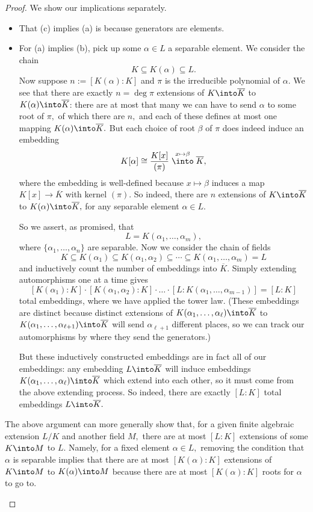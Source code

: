 \begin{proof}
	We show our implications separately.
	\begin{itemize}
		\item That (c) implies (a) is because generators are elements.

		\item For (a) implies (b), pick up some $\alpha\in L$ a separable element. We consider the chain
		\[K\subseteq K(\alpha)\subseteq L.\]
		Now suppose $n:=[K(\alpha):K]$ and $\pi$ is the irreducible polynomial of $\alpha.$ We see that there are exactly $n=\deg\pi$ extensions of $K\into\overline K$ to $K(\alpha)\into\overline K$: there are at most that many we can have to send $\alpha$ to some root of $\pi,$ of which there are $n,$ and each of these defines at most one mapping $K(\alpha)\into\overline K.$ But each choice of root $\beta$ of $\pi$ does indeed induce an embedding
		\[K[\alpha]\cong\frac{K[x]}{(\pi)}\stackrel{x\mapsto\beta}\into\overline K,\]
		where the embedding is well-defined because $x\mapsto\beta$ induces a map $K[x]\to\overline K$ with kernel $(\pi).$ So indeed, there are $n$ extensions of $K\into\overline K$ to $K(\alpha)\into\overline K,$ for any separable element $\alpha\in L.$

		So we assert, as promised, that
		\[L=K(\alpha_1,\ldots,\alpha_m),\]
		where $\{\alpha_1,\ldots,\alpha_n\}$ are separable. Now we consider the chain of fields
		\[K\subseteq K(\alpha_1)\subseteq K(\alpha_1,\alpha_2)\subseteq\cdots\subseteq K(\alpha_1,\ldots,\alpha_m)=L\]
		and inductively count the number of embeddings into $\overline K.$ Simply extending automorphisms one at a time gives
		\[[K(\alpha_1):K]\cdot[K(\alpha_1,\alpha_2):K]\cdot\ldots\cdot[L:K(\alpha_1,\ldots,\alpha_{m-1})]=[L:K]\]
		total embeddings, where we have applied the tower law. (These embeddings are distinct because distinct extensions of $K(\alpha_1,\ldots,\alpha_\ell)\into\overline K$ to $K(\alpha_1,\ldots,\alpha_{\ell+1})\into\overline K$ will send $\alpha_{\ell+1}$ different places, so we can track our automorphisms by where they send the generators.)

		But these inductively constructed embeddings are in fact all of our embeddings: any embedding $L\into\overline K$ will induce embeddings $K(\alpha_1,\ldots,\alpha_\ell)\into\overline K$ which extend into each other, so it must come from the above extending process. So indeed, there are exactly $[L:K]$ total embeddings $L\into\overline K.$
	\end{itemize}
	\begin{remark} \label{rem:boundextensions}
		The above argument can more generally show that, for a given finite algebraic extension $L/K$ and another field $M,$ there are at most $[L:K]$ extensions of some $K\into M$ to $L.$ Namely, for a fixed element $\alpha\in L,$ removing the condition that $\alpha$ is separable implies that there are at most $[K(\alpha):K]$ extensions of $K\into M$ to $K(\alpha)\into M$ because there are at most $[K(\alpha):K]$ roots for $\alpha$ to go to.
		

\end{remark}
\end{proof}

